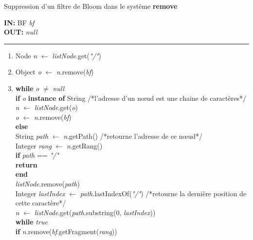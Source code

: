 \documentclass[a4paper,11pt]{report}
\begin{document}
\newpage
\begin{algorithme}
	Suppression d'un filtre de Bloom dans le système \textbf{remove}
\end{algorithme}

\begin{flushleft}
	\begin{framed}
		\textbf{IN:} BF \textit{bf} \\
		\textbf{OUT:} \textit{null}\\
		\noindent\rule{\linewidth}{0.5pt}

		\begin{enumerate}
			\item Node \textit{n} $\leftarrow$ \textit{listNode}.get(\textit{"/"})
			\item Object \textit{o} $\leftarrow$ \textit{n}.remove(\textit{bf})
			\item
				\begin{tabbing}
					\textbf{wh}\=\textbf{ile }\textit{o} $\neq$ \textit{null}\\
						\> \textbf{if }\= \textit{o} \textbf{instance of} String /*l'adresse d'un nœud est une chaine de caractères*/\\
						\> \> \textit{n} $\leftarrow$ \textit{listNode}.get(\textit{o})\\
						\> \> \textit{o} $\leftarrow$ \textit{n}.remove(\textit{bf})\\
						\> \textbf{else}\\
						\> \> String \textit{path} $\leftarrow$ \textit{n}.getPath() /*retourne l'adresse de ce nœud*/\\
						\> \> Integer \textit{rang} $\leftarrow$ \textit{n}.getRang()\\
						\> \> \textbf{if }\= \textit{path} == \textit{"/"}\\
						\> \> \> \textbf{return}\\
						\> \> \textbf{end}\\						
						\> \> \textit{listNode}.remove(\textit{path})\\
						\> \> Integer \textit{lastIndex} $\leftarrow$ \textit{path}.lastIndexOf(\textit{"/"}) /*retourne la dernière position de cette caractère*/\\
						\> \> \textit{n} $\leftarrow$ \textit{listNode}.get(\textit{path}.substring(0, \textit{lastIndex}))\\
						\> \> \textbf{wh}\=\textbf{ile }\textit{true}\\
						\> \> \> \textbf{if }\= \textit{n}.remove(\textit{bf}.getFragment(\textit{rang}))\\

\end{tabbing}
\end{enumerate}
\end{framed}
\end{flushleft}
\end{document}
